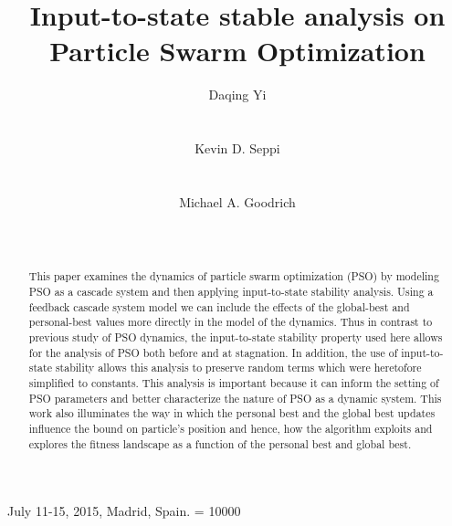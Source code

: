 \documentclass{sig-alternate}
\begin{document}
	
 {July 11-15, 2015, Madrid, Spain.}
\widowpenalty = 10000

\title{Input-to-state stable analysis on Particle Swarm Optimization}


\author{
\alignauthor
Daqing Yi \\
\\
\\
\alignauthor
Kevin D. Seppi \\
\\
\\
\alignauthor
Michael A. Goodrich \\
\\
\\
}

\maketitle

\begin{abstract}
This paper examines the dynamics of particle swarm optimization (PSO) by modeling PSO as a cascade system and then applying input-to-state stability analysis.
Using a feedback cascade system model we can include the effects of the global-best and personal-best values more directly in the model of the dynamics.
Thus in contrast to previous study of PSO dynamics, the input-to-state stability property used here allows for the analysis of PSO both before and at stagnation.
In addition, the use of input-to-state stability allows this analysis to preserve random terms which were heretofore simplified to constants.
This analysis is important because it can inform the setting of PSO parameters and better characterize the nature of PSO as a dynamic system.
This work also illuminates the way in which the personal best and the global best updates influence the bound on particle's position and hence, how the algorithm exploits and explores the fitness landscape as a function of the personal best and global best.
\end{abstract}
\end{document}
